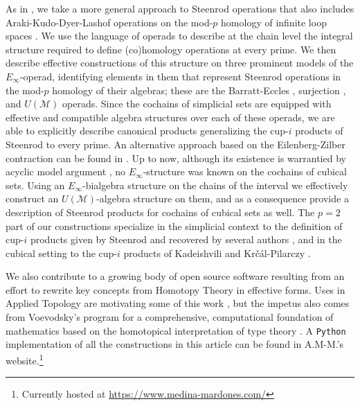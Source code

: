 \documentclass[A4]{amsart}
\theoremstyle{definition}
\begin{document}
As in \cite{may70generalapproach}, we take a more general approach to Steenrod operations that also includes Araki-Kudo-Dyer-Lashof operations on the mod-$p$ homology of infinite loop spaces \cites{araki56squaring, dyer62lashof}. We use the language of operads \cite{may72geometry}  to describe at the chain level the integral structure required to define (co)homology operations at every prime. We then describe effective constructions of this structure on three prominent models of the $E_\infty$-operad, identifying elements in them that represent Steenrod operations in the mod-$p$ homology of their algebras; these are the Barratt-Eccles \cite{berger04combinatorial}, surjection \cite{mcclure03cochain}, and $U(\mathcal M)$ \cite{medina2020prop1} operads. Since the cochains of simplicial sets are equipped with effective and compatible algebra structures over each of these operads, we are able to explicitly describe canonical products generalizing the \mbox{cup-$i$} products of Steenrod to every prime. An alternative approach based on the Eilenberg-Zilber contraction can be found in \cite{gonzalez2005hpt}. Up to now, although its existence is warrantied by acyclic model argument \cite{eilenberg1953acyclic}, no $E_\infty$-structure was known on the cochains of cubical sets. Using an $E_\infty$-bialgebra structure on the chains of the interval we effectively construct an $U(\mathcal M)$-algebra structure on them, and as a consequence provide a description of Steenrod products for cochains of cubical sets as well. The $p=2$ part of our constructions specialize in the simplicial context to the definition of cup-$i$ products given by Steenrod \cite{steenrod47products} and recovered by several authors \cites{mcclure03cochain, berger04combinatorial, medina2018axiomatic}, and in the cubical setting to the cup-$i$ products of  Kadeishvili \cite{kadeishvili1998dg} and Kr\v{c}\'{a}l-Pilarczy \cite{pilarczyk2016cubical}.

We also contribute to a growing body of open source software \cites{manero2020effective, pilarczyk2015contraction, sagemath} resulting from an effort to rewrite key concepts from Homotopy Theory in effective forms. Uses in Applied Topology are motivating some of this work \cite{tauzin2020giottotda}, but the impetus also comes from Voevodsky's program for a comprehensive, computational foundation of mathematics based on the homotopical interpretation of type theory \cite{bauer2017hott}. A \texttt{Python} implementation of all the constructions in this article can be found in A.M-M.'s website.\footnote{Currently hosted at \url{https://www.medina-mardones.com/}}
\end{document}
